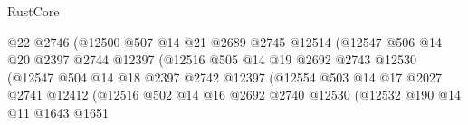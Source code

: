 \begin{lexlean}{RustCore}
\begin{coremodule}
                                        @22
                                        @2746
                                        (@12500
                                          @507
                                          @14
                                          @21
                                          @2689
                                          @2745
                                          @12514
                                          (@12547
                                            @506
                                            @14
                                            @20
                                            @2397
                                            @2744
                                            @12397
                                            (@12516
                                              @505
                                              @14
                                              @19
                                              @2692
                                              @2743
                                              @12530
                                              (@12547
                                                @504
                                                @14
                                                @18
                                                @2397
                                                @2742
                                                @12397
                                                (@12554
                                                  @503
                                                  @14
                                                  @17
                                                  @2027
                                                  @2741
                                                  @12412
                                                  (@12516
                                                    @502
                                                    @14
                                                    @16
                                                    @2692
                                                    @2740
                                                    @12530
                                                    (@12532
                                                      @190
                                                      @14
                                                      @11
                                                      @1643
                                                      @1651

\end{coremodule}
\end{lexlean}
